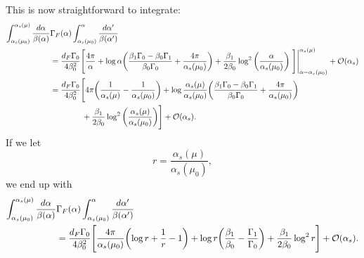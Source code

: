 \documentclass[11pt,twoside,reqno]{amsart}
\theoremstyle{plain}
\theoremstyle{remark}
\theoremstyle{definition}
\theoremstyle{remark}
\theoremstyle{definition}
\theoremstyle{definition}
\newcommand{\cO}{\mathcal{O}}
\begin{document}
	This is now straightforward to integrate:
	\begin{equation}
	\begin{aligned}
		\int_{\alpha_s(\mu_0)}^{\alpha_s(\mu)} \frac{d\alpha}{\beta(\alpha)}&\Gamma_F(\alpha)\int_{\alpha_s(\mu_0)}^\alpha \frac{d\alpha'}{\beta(\alpha')} \\
		&= \frac{d_F\Gamma_0}{4\beta_0^2}\Bigg[ \frac{4\pi}{\alpha} + \log\alpha \qty(\frac{\beta_1\Gamma_0 - \beta_0 \Gamma_1}{\beta_0\Gamma_0} + \frac{4\pi}{\alpha_s(\mu_0)}) + \frac{\beta_1}{2\beta_0}\log^2\qty(\frac{\alpha}{\alpha_s(\mu_0)}) \eval{\Bigg]}_{\alpha = \alpha_s(\mu_0)}^{\alpha_s(\mu)} + \cO(\alpha_s) \\
		&= \frac{d_F\Gamma_0}{4\beta_0^2}\Bigg[4\pi\qty(\frac{1}{\alpha_s(\mu)} - \frac{1}{\alpha_s(\mu_0)}) + \log\frac{\alpha_s(\mu)}{\alpha_s(\mu_0)}\qty(\frac{\beta_1\Gamma_0 - \beta_0 \Gamma_1}{\beta_0\Gamma_0} + \frac{4\pi}{\alpha_s(\mu_0)}) \\
			&\qquad\qquad+ \frac{\beta_1}{2\beta_0}\log^2\qty(\frac{\alpha_s(\mu)}{\alpha_s(\mu_0)})\Bigg] + \cO(\alpha_s).
	\end{aligned}
	\end{equation}
	If we let
	\begin{equation}
		r = \frac{\alpha_s(\mu)}{\alpha_s(\mu_0)},
	\end{equation}
	we end up with
	\begin{equation}\label{eq:first exponentiated integral}
	\begin{aligned}
		\int_{\alpha_s(\mu_0)}^{\alpha_s(\mu)} \frac{d\alpha}{\beta(\alpha)}&\Gamma_F(\alpha)\int_{\alpha_s(\mu_0)}^\alpha \frac{d\alpha'}{\beta(\alpha')} \\
		&= \frac{d_F\Gamma_0}{4\beta_0^2}\Bigg[\frac{4\pi}{\alpha_s(\mu_0)}\qty(\log r + \frac{1}{r} - 1) + \log r \qty(\frac{\beta_1}{\beta_0} - \frac{\Gamma_1}{\Gamma_0}) + \frac{\beta_1}{2\beta_0}\log^2 r \Bigg] + \cO(\alpha_s).
	\end{aligned}
	\end{equation}
\end{document}
